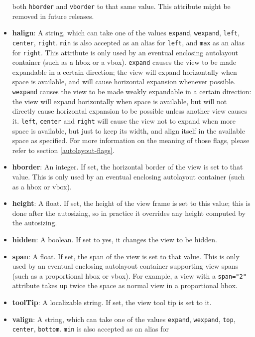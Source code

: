 \begin{itemize}
  both \texttt{hborder} and \texttt{vborder} to that same value.  This
  attribute might be removed in future releases.
\item {\bf halign}: A string, which can take one of the values
  \texttt{expand}, \texttt{wexpand}, \texttt{left}, \texttt{center},
  \texttt{right}.  \texttt{min} is also accepted as an alias for
  \texttt{left}, and \texttt{max} as an alias for \texttt{right}.
  This attribute is only used by an eventual enclosing autolayout
  container (such as a hbox or a vbox).  \texttt{expand} causes the
  view to be made expandable in a certain direction; the view will
  expand horizontally when space is available, and will cause
  horizontal expansion whenever possible.  \texttt{wexpand} causes the
  view to be made weakly expandable in a certain direction: the view
  will expand horizontally when space is available, but will not
  directly cause horizontal expansion to be possible unless another
  view causes it.  \texttt{left}, \texttt{center} and \texttt{right}
  will cause the view not to expand when more space is available, but
  just to keep its width, and align itself in the available space as
  specified.  For more information on the meaning of those flags,
  please refer to section \ref{autolayout-flags}.
\item {\bf hborder}: An integer.  If set, the horizontal border of the
  view is set to that value.  This is only used by an eventual
  enclosing autolayout container (such as a hbox or vbox).
\item {\bf height}: A float.  If set, the height of the view frame is
  set to this value; this is done after the autosizing, so in practice
  it overrides any height computed by the autosizing.
\item {\bf hidden}: A boolean.  If set to yes, it changes the view to
  be hidden.
\item {\bf span}: A float.  If set, the span of the view is set to
  that value.  This is only used by an eventual enclosing autolayout
  container supporting view spans (such as a proportional hbox or
  vbox).  For example, a view with a \texttt{span="2"} attribute takes
  up twice the space as normal view in a proportional hbox.
\item {\bf toolTip}: A localizable string.  If set, the view tool tip
  is set to it.
\item {\bf valign}: A string, which can take one of the values
  \texttt{expand}, \texttt{wexpand}, \texttt{top}, \texttt{center},
  \texttt{bottom}.  \texttt{min} is also accepted as an alias for

\end{itemize}
